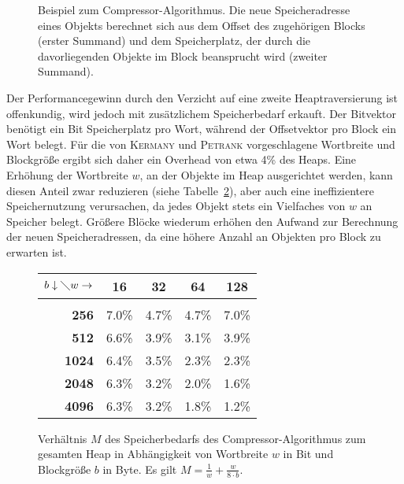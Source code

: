 
\begin{figure}[h]
	\centering
	
	\caption[Beispiel zum Compressor-Algorithmus]{Beispiel zum Compressor-Algorithmus. Die neue Speicheradresse eines Objekts berechnet sich aus dem Offset des zugehörigen Blocks (erster Summand) und dem Speicherplatz, der durch die davorliegenden Objekte im Block beansprucht wird (zweiter Summand).}
	\label{fig:compressor-example}
\end{figure}

Der Performancegewinn durch den Verzicht auf eine zweite Heaptraversierung ist offenkundig, wird jedoch mit zusätzlichem Speicherbedarf erkauft.
Der Bitvektor benötigt ein Bit Speicherplatz pro Wort, während der Offsetvektor pro Block ein Wort belegt.
Für die von \textsc{Kermany} und \textsc{Petrank} vorgeschlagene Wortbreite und Blockgröße ergibt sich daher ein Overhead von etwa 4\% des Heaps.
Eine Erhöhung der Wortbreite $w$, an der Objekte im Heap ausgerichtet werden, kann diesen Anteil zwar reduzieren (siehe Tabelle~\ref{tab:compressor}), aber auch eine ineffizientere Speichernutzung verursachen, da jedes Objekt stets ein Vielfaches von $w$ an Speicher belegt.
Größere Blöcke wiederum erhöhen den Aufwand zur Berechnung der neuen Speicheradressen, da eine höhere Anzahl an Objekten pro Block zu erwarten ist.

\begin{figure}[h]
	\centering \renewcommand{\arraystretch}{1.15} 
	\begin{tabular}{|r|cccc|}
		\hline
		$b \downarrow \diagdown w \rightarrow$ &  \textbf{16}   &  \textbf{32}   &  \textbf{64}   &  \textbf{128}  \\ \hline
                             & \hspace{1.5cm}  &  \hspace{1.5cm}  &  \hspace{1.5cm}   &   \hspace{1.5cm}   \\[-0.6cm]
		                                 \textbf{256} & 7.0\% & 4.7\% & 4.7\% & 7.0\% \\ \hline
		                                 \textbf{512} & 6.6\% & 3.9\% & 3.1\% & 3.9\% \\ \hline
		                                \textbf{1024} & 6.4\% & 3.5\% & 2.3\% & 2.3\% \\ \hline
		                                \textbf{2048} & 6.3\% & 3.2\% & 2.0\% & 1.6\% \\ \hline
		                                \textbf{4096} & 6.3\% & 3.2\% & 1.8\% & 1.2\% \\ \hline
	\end{tabular} 

	\vspace*{0.3cm}
	
	\caption[Speicherbedarf des Compressor-Algorithmus]{Verhältnis $M$ des Speicherbedarfs des Compressor-Algorithmus zum gesamten Heap in Abhängigkeit von Wortbreite $w$ in Bit und Blockgröße $b$ in Byte. Es gilt $M = \frac{1}{w} + \frac{w}{8 \cdot b}$.}
	\label{tab:compressor}
\end{figure}

